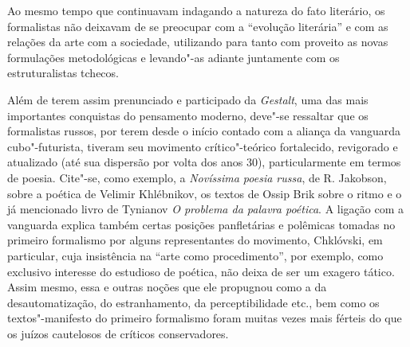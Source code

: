 Ao mesmo tempo que continuavam indagando a natureza do fato literário,
os formalistas não deixavam de se preocupar com a ``evolução literária'' e com as relações da arte com a sociedade, utilizando para
tanto com proveito as novas formulações metodológicas e levando"-as
adiante juntamente com os estruturalistas tchecos.

Além de terem assim prenunciado e participado da \emph{Gestalt}, uma das
mais importantes conquistas do pensamento moderno, deve"-se ressaltar que
os formalistas russos, por terem desde o início contado com a aliança da
vanguarda cubo"-futurista, tiveram seu movimento crítico"-teórico
fortalecido, revigorado e atualizado (até sua dispersão por volta dos
anos 30), particularmente em termos de poesia. Cite"-se, como exemplo, a
\emph{Novíssima poesia russa}, de R. Jakobson, sobre a poética de Velimir
Khlébnikov, os textos de Ossip Brik sobre o ritmo e o já mencionado
livro de Tynianov \emph{O problema da palavra poética}. A ligação com a
vanguarda explica também certas posições panfletárias e polêmicas
tomadas no primeiro formalismo por alguns representantes do movimento,
Chklóvski, em particular, cuja insistência na ``arte como
procedimento'', por exemplo, como exclusivo interesse do estudioso de
poética, não deixa de ser um exagero tático. Assim mesmo, essa e outras noções que ele propugnou como a
da desautomatização, do estranhamento, da perceptibilidade etc., bem
como os textos"-manifesto do primeiro formalismo foram muitas vezes mais
férteis do que os juízos cautelosos de críticos conservadores.

